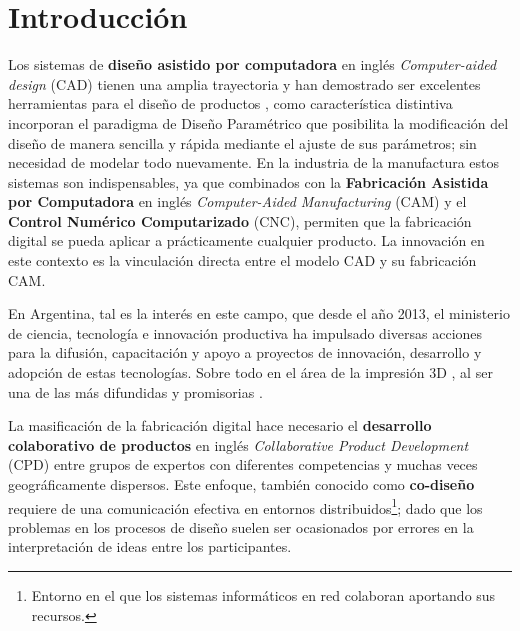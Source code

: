 \chapter{Introducción}
\label{chap:cap1}
Los sistemas de \textbf{diseño asistido por computadora} en inglés \textit{Computer-aided design} (CAD) tienen una amplia trayectoria y han demostrado ser excelentes herramientas para el diseño de productos \citep{Chao2001},  como característica distintiva incorporan el paradigma de Diseño Paramétrico \citep{Davis2013} que posibilita la modificación del diseño de manera sencilla y rápida mediante el ajuste de sus parámetros; sin necesidad de modelar todo nuevamente.
En la industria de la manufactura estos sistemas son indispensables, ya que combinados con la \textbf{Fabricación Asistida por Computadora} en inglés \textit{Computer-Aided Manufacturing}  (CAM) y el \textbf{Control Numérico Computarizado} (CNC), permiten que la fabricación digital \citep{Chryssolouris2009} se pueda aplicar a prácticamente cualquier producto. La innovación en este contexto es la vinculación directa entre el modelo CAD y su fabricación CAM. 

En Argentina, tal es la interés en este campo, que desde el año 2013, el ministerio de ciencia, tecnología e innovación productiva ha impulsado diversas acciones para la difusión, capacitación y apoyo a proyectos de innovación, desarrollo y adopción de estas tecnologías. Sobre todo en el área de la impresión 3D \citep{BERMAN2012155}, al ser una de las más difundidas y promisorias \citep{MinisteriodeCiencia2015}.


La masificación de la fabricación digital hace necesario el \textbf{desarrollo colaborativo de productos} en inglés \textit{Collaborative Product Development} (CPD) \citep{Elfving2007} entre grupos de expertos con diferentes competencias y muchas veces geográficamente dispersos. Este enfoque, también conocido como \textbf{co-diseño} \citep{PerezGarcia2014} requiere de una comunicación efectiva en entornos distribuidos\footnote{Entorno en el que los sistemas informáticos en red colaboran aportando sus recursos.}; dado que los problemas en los procesos de diseño suelen ser ocasionados por errores en la interpretación de ideas entre los participantes.


